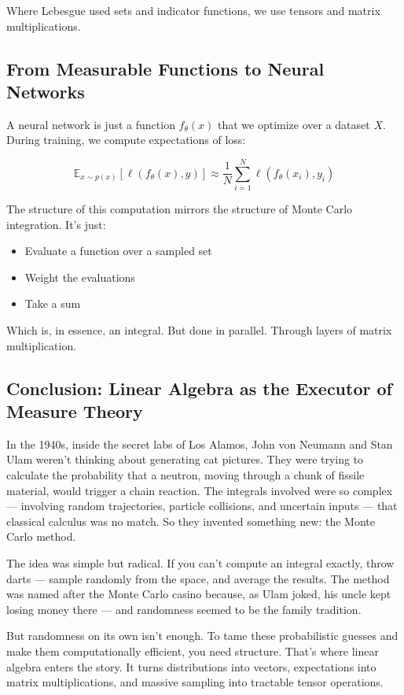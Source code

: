 Where Lebesgue used sets and indicator functions, we use tensors and matrix multiplications.

\subsection{From Measurable Functions to Neural Networks}

A neural network is just a function \( f_\theta(x) \) that we optimize over a dataset \( X \). During training, we compute expectations of loss:

\[
\mathbb{E}_{x \sim p(x)} [\ell(f_\theta(x), y)] \approx \frac{1}{N} \sum_{i=1}^N \ell(f_\theta(x_i), y_i)
\]

The structure of this computation mirrors the structure of Monte Carlo integration. It’s just:

\begin{itemize}
  \item Evaluate a function over a sampled set
  \item Weight the evaluations
  \item Take a sum
\end{itemize}

Which is, in essence, an integral. But done in parallel. Through layers of matrix multiplication.

\subsection{Conclusion: Linear Algebra as the Executor of Measure Theory}

In the 1940s, inside the secret labs of Los Alamos, John von Neumann and Stan Ulam weren’t thinking about generating cat pictures. They were trying to calculate the probability that a neutron, moving through a chunk of fissile material, would trigger a chain reaction. The integrals involved were so complex — involving random trajectories, particle collisions, and uncertain inputs — that classical calculus was no match. So they invented something new: the Monte Carlo method.

The idea was simple but radical. If you can’t compute an integral exactly, throw darts — sample randomly from the space, and average the results. The method was named after the Monte Carlo casino because, as Ulam joked, his uncle kept losing money there — and randomness seemed to be the family tradition.

But randomness on its own isn’t enough. To tame these probabilistic guesses and make them computationally efficient, you need structure. That’s where linear algebra enters the story. It turns distributions into vectors, expectations into matrix multiplications, and massive sampling into tractable tensor operations.

